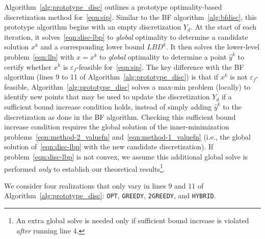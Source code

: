 \documentclass{article}
\newcommand{\1}[1]{\mathds{1}\left[#1\right]}
\begin{document}
Algorithm~\ref{alg:prototype_disc} outlines a prototype optimality-based discretization method for~\eqref{eqn:sip}.
Similar to the BF algorithm~\ref{alg:bfdisc}, this prototype algorithm begins with an empty discretization $Y_d$.
At the start of each iteration, it solves~\eqref{eqn:disc-lbp} to \textit{global} optimality to determine a candidate solution $x^k$ and a corresponding lower bound $LBD^k$.
It then solves the lower-level problem~\eqref{eqn:llp} with $x = x^k$ to \textit{global} optimality to determine a point $\hat{y}^k$ to certify whether $x^k$ is $\varepsilon_f$-feasible for~\eqref{eqn:sip}.
The key difference with the BF algorithm (lines 9 to 11 of Algorithm~\ref{alg:prototype_disc}) is that if $x^k$ is not $\varepsilon_f$-feasible, Algorithm~\ref{alg:prototype_disc} solves a max-min problem (locally) to identify new points that may be used to update the discretization $Y_d$ if a sufficient bound increase condition holds, instead of simply adding $\hat{y}^k$ to the discretization as done in the BF algorithm.
Checking this sufficient bound increase condition requires the global solution of the inner-minimization problems~\eqref{eqn:method-2_valuefn} and~\eqref{eqn:method-1_valuefn} (i.e., the global solution of~\eqref{eqn:disc-lbp} with the new candidate discretization).
If problem~\eqref{eqn:disc-lbp} is not convex, we assume this additional global solve is performed \textit{only} to establish our theoretical results\footnote{An extra global solve is needed only if sufficient bound increase is violated \textit{after} running line 4.}.


We consider four realizations that only vary in lines 9 and 11 of Algorithm~\ref{alg:prototype_disc}:
 \texttt{OPT}, \texttt{GREEDY}, \texttt{2GREEDY}, and \texttt{HYBRID}. 
\end{document}
